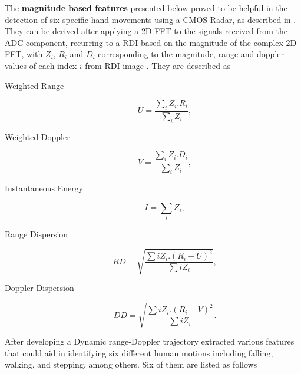 The \textbf{magnitude based features} presented below proved to be helpful in the detection of six specific hand movements using a CMOS Radar, as described in \cite{SOA_Magnitude_Phase_Features}. They can be derived after applying a \gls{2D-FFT} to the signals received from the \gls{ADC} component, recurring to a \gls{RDI} based on the magnitude of the complex 2D \gls{FFT}, with $Z_i$, $R_i$ and $D_i$ corresponding to the magnitude, range and doppler values of each index $i$ from \gls{RDI} image \cite{SOA_Magnitude_Phase_Features}. They are described as

\begin{description}
    \item[Weighted Range] 
    \begin{equation} \label{eq:weightedRange_ft}
     U = \frac{\sum_{i} Z_i.R_i}{\sum_{i} Z_i},
    \end{equation}

    \item[Weighted Doppler] 
    \begin{equation} \label{eq:weightedDoppler_ft}
     V = \frac{\sum_{i} Z_i.D_i}{\sum_{i} Z_i},
    \end{equation}

    \item[Instantaneous Energy] 
    \begin{equation} \label{eq:instantaneousEnergy_ft}
    I = \sum_{i} Z_i,
    \end{equation}

    \item[Range Dispersion] 
    \begin{equation} \label{eq:rangeDispersion_ft}
     RD = \sqrt{ \frac{ \sum{i} Z_i.(R_i-U)^2 } {\sum{i} Z_i} },
    \end{equation}

    \item[Doppler Dispersion] 
    \begin{equation} \label{eq:dopplerDispersion_ft}
     DD = \sqrt{ \frac{ \sum{i} Z_i.(R_i-V)^2 } {\sum{i} Z_i} }.
    \end{equation}    
\end{description}

After developing a Dynamic range-Doppler trajectory \cite{SOA_DRDTmap_features} extracted various features that could aid in identifying six different human motions including falling, walking, and stepping, among others. Six of them are listed as follows

